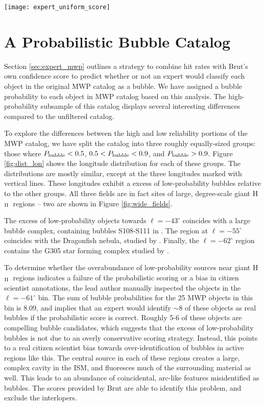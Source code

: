 \documentclass[preprint]{aastex}
\newcommand{\hii}[0]{H$_{\rm II}$}
\begin{document}
\begin{figure*}
\texttt{[image: expert\_uniform\_score]}
\caption{The same as Figure \ref{fig:expert_uniform_score}, for the Uniform sample.}
\label{fig:expert_uniform_score}
\end{figure*}

\section{A Probabilistic Bubble Catalog}
\label{sec:prob}
Section \ref{sec:expert_mwp} outlines a strategy to combine hit rates with Brut's own confidence score to predict whether or not
an expert would classify each object in the original MWP catalog as a bubble. We have assigned a bubble probability to each
object in MWP catalog based on this analysis. The high-probability subsample of this catalog displays several interesting differences compared to the unfiltered catalog. 

To explore the differences between the high and low reliability portions of the MWP catalog, we have split the catalog into three roughly equally-sized groups: those where $P_{\rm bubble} < 0.5$, $0.5 < P_{\rm bubble} < 0.9$,
and $P_{\rm bubble} > 0.9$. Figure \ref{fig:dist_lon} shows the longitude distribution for each of these groups. The distributions are mostly similar, except at the three longitudes marked with vertical lines. These longitudes exhibit a excess of low-probability bubbles relative to the other groups.  All three fields are in fact sites of large, degree-scale giant \hii\, regions -- two are shown in Figure \ref{fig:wide_fields}. 

The excess of low-probability objects towards $\ell=-43^\circ$ coincides with a large bubble complex, containing bubbles S108-S111 in \cite{Churchwell06}. The region at $\ell=-55^\circ$ coincides with the Dragonfish nebula, studied by \cite{Rahman11}. Finally, the $\ell=-62^\circ$ region contains the G305 star forming complex studied by \cite{Hindson12}.

To determine whether the overabundance of low-probability sources near giant \hii\, regions indicates a failure of the probabilistic scoring or a bias in citizen scientist annotations, the lead author manually inspected the objects in the $\ell=-61^\circ$ bin. The sum of bubble probabilities for the 25 MWP objects in this bin is 8.09, and implies that an expert would identify $\sim 8$ of these objects as real bubbles if the probabilistic score is correct. Roughly 5-6 of these objects are compelling bubble candidates, which suggests that the excess of low-probability bubbles is not due to an overly conservative scoring strategy. Instead, this points to a real citizen scientist bias towards over-identification of bubbles in active regions like this. The central source in each of these regions creates a large, complex cavity in the ISM, and fluoresces much of the surrounding material as well. This leads to an abundance of coincidental, arc-like features misidentified as bubbles. The scores provided by Brut are able to identify this problem, and exclude the interlopers.
\end{document}
